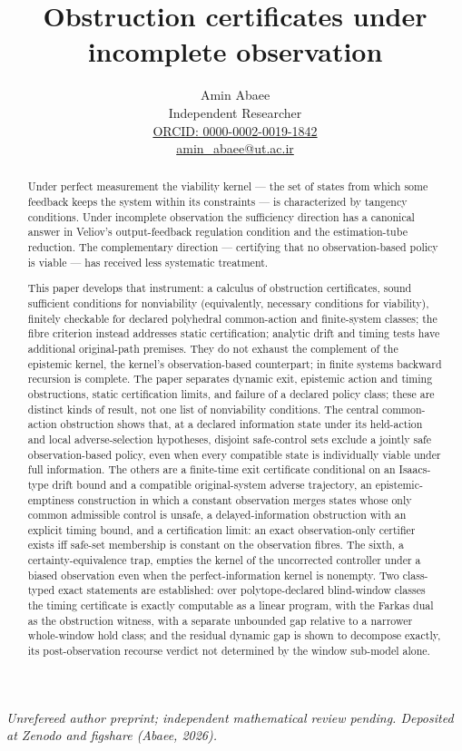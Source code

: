 \documentclass[10pt,twocolumn]{article}
\title{Obstruction certificates under incomplete observation}
\author{Amin Abaee\\[0.35em]
{\small Independent Researcher}\\[0.55em]
{\small\href{https://orcid.org/0000-0002-0019-1842}{ORCID: 0000-0002-0019-1842}}\\[0.3em]
{\small\href{mailto:amin\_abaee@ut.ac.ir}{amin\_abaee@ut.ac.ir}}}
\theoremstyle{definition}
\begin{document}
\maketitle
\begin{center}\small\emph{Unrefereed author preprint; independent mathematical review pending. Deposited at Zenodo and figshare (Abaee, 2026).}\end{center}

\begin{abstract}

Under perfect measurement the viability kernel --- the set of states
from which some feedback keeps the system within its constraints --- is
characterized by tangency conditions. Under incomplete observation the
sufficiency direction has a canonical answer in Veliov's
output-feedback regulation condition and the estimation-tube reduction.
The complementary direction --- certifying that no observation-based
policy is viable --- has received less systematic treatment.

This paper develops that instrument: a calculus of obstruction
certificates, sound sufficient conditions for nonviability (equivalently, necessary conditions for viability), finitely
checkable for declared polyhedral common-action and finite-system classes; the fibre criterion instead addresses static certification; analytic drift and timing tests have additional original-path premises. They do not exhaust the complement of the epistemic kernel, the kernel's observation-based counterpart; in finite systems backward recursion is complete. The paper separates dynamic exit, epistemic action and timing
obstructions, static certification limits, and failure of a declared
policy class; these are distinct kinds of result, not one list of
nonviability conditions. The central common-action obstruction shows that, at a declared
information state under its held-action and local adverse-selection
hypotheses, disjoint safe-control sets exclude a jointly safe
observation-based policy, even when every compatible state is
individually viable under full information. The others are a finite-time
exit certificate conditional on an Isaacs-type drift bound and a compatible original-system adverse trajectory, an
epistemic-emptiness construction in which a constant observation merges
states whose only common admissible control is unsafe, a delayed-information
obstruction with an explicit timing bound, and a certification limit:
an exact observation-only certifier exists iff safe-set
membership is constant on the observation fibres. The sixth, a
certainty-equivalence trap, empties the kernel of the uncorrected controller under a biased
observation even when the perfect-information kernel is nonempty.
Two class-typed exact statements are established: over polytope-declared
blind-window classes the timing certificate is exactly computable as a linear
program, with the Farkas dual as the obstruction witness, with a separate unbounded gap relative to a narrower whole-window hold class; and the residual dynamic
gap is shown to decompose exactly, its post-observation recourse verdict not determined by the window sub-model
alone.


\end{abstract}
\end{document}
